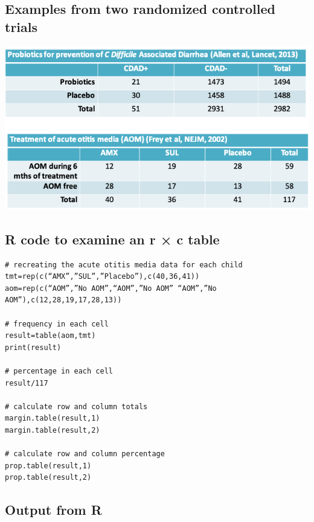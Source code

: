 \documentclass[
]{book}
\begin{document}
\hypertarget{examples-from-two-randomized-controlled-trials}{%
\subsection{Examples from two randomized controlled trials}\label{examples-from-two-randomized-controlled-trials}}

\includegraphics[width=1\linewidth]{./8_21}

\hypertarget{r-code-to-examine-an-r-c-table}{%
\subsection{R code to examine an r × c table}\label{r-code-to-examine-an-r-c-table}}

\begin{verbatim}
# recreating the acute otitis media data for each child
tmt=rep(c(“AMX”,”SUL”,”Placebo”),c(40,36,41))
aom=rep(c(“AOM”,”No AOM”,“AOM”,”No AOM” “AOM”,”No AOM”),c(12,28,19,17,28,13))

# frequency in each cell
result=table(aom,tmt)
print(result)

# percentage in each cell
result/117

# calculate row and column totals
margin.table(result,1)
margin.table(result,2)

# calculate row and column percentage
prop.table(result,1)
prop.table(result,2)
\end{verbatim}

\hypertarget{output-from-r}{%
\subsection{Output from R}\label{output-from-r}}
\end{document}
